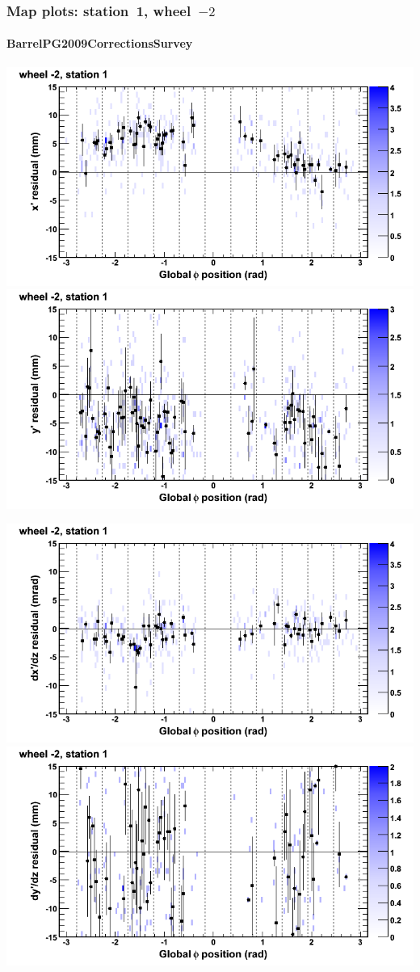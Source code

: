 \documentclass[compress]{beamer}
\begin{document}
\begin{frame}
\frametitle{Map plots: station~1, wheel~$-2$}
\framesubtitle{BarrelPG2009CorrectionsSurvey}
\includegraphics[width=0.5\linewidth]{mapplots_01/DTvsphi_st1whA_x.png}
\includegraphics[width=0.5\linewidth]{mapplots_01/DTvsphi_st1whA_y.png}

\includegraphics[width=0.5\linewidth]{mapplots_01/DTvsphi_st1whA_dxdz.png}
\includegraphics[width=0.5\linewidth]{mapplots_01/DTvsphi_st1whA_dydz.png}
\end{frame}
\end{document}
